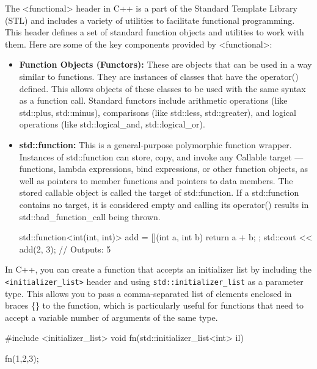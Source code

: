 \documentclass{report}
\begin{document}
    \pagebreak
    \bigbreak \noindent 
    \begin{concept}
       The <functional> header in C++ is a part of the Standard Template Library (STL) and includes a variety of utilities to facilitate functional programming. This header defines a set of standard function objects and utilities to work with them. Here are some of the key components provided by <functional>:
    \end{concept}
    \begin{itemize}
        \item \textbf{Function Objects (Functors):} These are objects that can be used in a way similar to functions. They are instances of classes that have the operator() defined. This allows objects of these classes to be used with the same syntax as a function call. Standard functors include arithmetic operations (like std::plus, std::minus), comparisons (like std::less, std::greater), and logical operations (like std::logical\_and, std::logical\_or).
        \item \textbf{std::function:} This is a general-purpose polymorphic function wrapper. Instances of std::function can store, copy, and invoke any Callable target — functions, lambda expressions, bind expressions, or other function objects, as well as pointers to member functions and pointers to data members. The stored callable object is called the target of std::function. If a std::function contains no target, it is considered empty and calling its operator() results in std::bad\_function_call being thrown.
            \bigbreak \noindent 
            \begin{cppcode}
                std::function<int(int, int)> add = [](int a, int b) { return a + b; };
                std::cout << add(2, 3); // Outputs: 5
            \end{cppcode}
    \end{itemize}

    \pagebreak
    \bigbreak \noindent 
    In C++, you can create a function that accepts an initializer list by including the \texttt{<initializer\_list>} header and using \texttt{std::initializer\_list} as a parameter type. This allows you to pass a comma-separated list of elements enclosed in braces \{\} to the function, which is particularly useful for functions that need to accept a variable number of arguments of the same type.
    \bigbreak \noindent 
    \begin{cppcode}
#include <initializer_list>
void fn(std::initializer_list<int> il) { }

fn({1,2,3});
    \end{cppcode}
\end{document}
